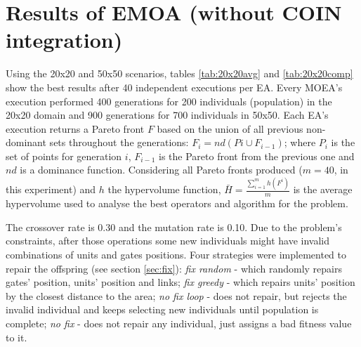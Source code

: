 \documentclass{llncs}
\begin{document}
\section{Results of EMOA (without COIN integration)}

Using the 20x20 and 50x50 scenarios, tables \ref{tab:20x20avg} and \ref{tab:20x20comp} show the best results after 40 independent executions per EA. Every MOEA's execution performed 400 generations for 200 individuals (population) in the 20x20 domain and 900 generations for 700 individuals in 50x50. Each EA's execution returns a Pareto front $F$ based on the union of all previous non-dominant sets throughout the generations: $F_i=nd\left(Pi  \cup  F_{i-1}\right)$; where $P_i$ is the set of points for generation $i$, $F_{i-1}$ is the Pareto front from the previous one and $nd$ is a dominance function. Considering all Pareto fronts produced ($m=40$, in this experiment) and $h$ the hypervolume function, $\bar{H}= \frac{\sum\limits_{i=1}^{m}h(F^i)}{m}$ is the average hypervolume used to analyse the best operators and algorithm for the problem.

The crossover rate is 0.30 and the mutation rate is 0.10.  Due to the problem's constraints, after those operations some new individuals might have invalid combinations of units and gates positions. Four strategies were implemented to repair the offspring (see section \ref{sec:fix}): \textit{fix random} - which randomly repairs gates' position, units' position and links; \textit{fix greedy} - which repairs units' position by the closest distance to the area; \textit{no fix loop} - does not repair, but rejects the invalid individual and keeps selecting new individuals until population is complete; \textit{no fix} - does not repair any individual, just assigns a bad fitness value to it.  


\end{document}
